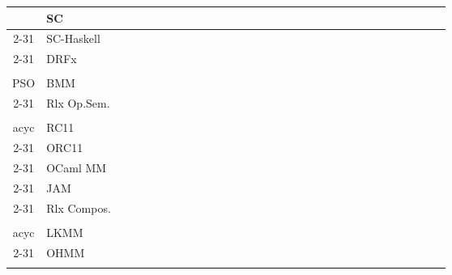 \begin{landscape}
\begin{table*}
\begin{tabular}{|c|l|c|c|c|c|c|c|c|c|c|c|c|c|c|c|c|c|c|c|c|c|c|c|c|c|c|c|c|c|c|}
 \Xhline{2\arrayrulewidth}
 
 \multirow{3}{*}{\rotatebox[origin=c]{270}{\makecell{SeqCst}}}   

 & SC             & & & & & & & & & & & & & & & & & & & & & & & & & & & & & \\ \cline{2-31}
 & SC-Haskell     & & & & & & & & & & & & & & & & & & & & & & & & & & & & & \\ \cline{2-31}
 & DRFx           & & & & & & & & & & & & & & & & & & & & & & & & & & & & & \\ \Xhline{2\arrayrulewidth}

 \multirow{2}{*}{\rotatebox[origin=c]{270}{\makecell{TSO\\PSO}}}   

 & BMM            & & & & & & & & & & & & & & & & & & & & & & & & & & & & & \\ \cline{2-31}

 & Rlx Op.Sem.    & & & & & & & & & & & & & & & & & & & & & & & & & & & & & \\ \Xhline{2\arrayrulewidth}

 \multirow{5}{*}{\rotatebox[origin=c]{270}{\makecell{$\lPO\lRF$\\acyc}}}   

 & RC11           & & & & & & & & & & & & & & & & & & & & & & & & & & & & & \\ \cline{2-31}

 & ORC11          & & & & & & & & & & & & & & & & & & & & & & & & & & & & & \\ \cline{2-31}

 & OCaml MM       & & & & & & & & & & & & & & & & & & & & & & & & & & & & & \\ \cline{2-31}

 & JAM            & & & & & & & & & & & & & & & & & & & & & & & & & & & & & \\ \cline{2-31}

 & Rlx Compos.    & & & & & & & & & & & & & & & & & & & & & & & & & & & & & \\ \Xhline{2\arrayrulewidth}

 \multirow{2}{*}{\rotatebox[origin=c]{270}{\makecell{$\lPPO\lRF$\\acyc}}}   

 & LKMM           & & & & & & & & & & & & & & & & & & & & & & & & & & & & & \\ \cline{2-31}

 & OHMM           & & & & & & & & & & & & & & & & & & & & & & & & & & & & & \\ \Xhline{2\arrayrulewidth}


\end{tabular}
\end{table*}
\end{landscape}
